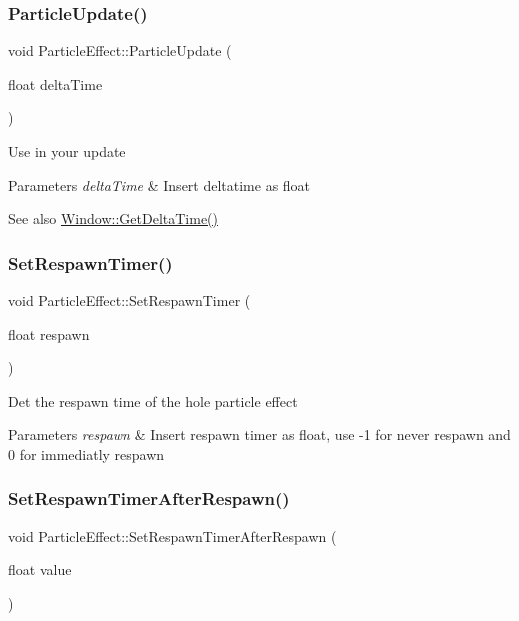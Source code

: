 \subsubsection{\texorpdfstring{ParticleUpdate()}{ParticleUpdate()}}
{\footnotesize\ttfamily void Particle\+Effect\+::\+Particle\+Update (\begin{DoxyParamCaption}\item[{float}]{delta\+Time }\end{DoxyParamCaption})}

Use in your update 
\begin{DoxyParams}{Parameters}
{\em delta\+Time} & Insert deltatime as float \\
\hline
\end{DoxyParams}
\begin{DoxySeeAlso}{See also}
\mbox{\hyperlink{class_window_ae7ce0586147cc93ba68d6ee929413f22}{Window\+::\+Get\+Delta\+Time()}} 
\end{DoxySeeAlso}
\mbox{\label{class_particle_effect_a62001aac47d157b8bbdc7d749f0f5c93}} 
\subsubsection{\texorpdfstring{SetRespawnTimer()}{SetRespawnTimer()}}
{\footnotesize\ttfamily void Particle\+Effect\+::\+Set\+Respawn\+Timer (\begin{DoxyParamCaption}\item[{float}]{respawn }\end{DoxyParamCaption})}

Det the respawn time of the hole particle effect 
\begin{DoxyParams}{Parameters}
{\em respawn} & Insert respawn timer as float, use -\/1 for never respawn and 0 for immediatly respawn \\
\hline
\end{DoxyParams}
\mbox{\label{class_particle_effect_a61209f0862c570e840664fb4e4051b01}} 
\subsubsection{\texorpdfstring{SetRespawnTimerAfterRespawn()}{SetRespawnTimerAfterRespawn()}}
{\footnotesize\ttfamily void Particle\+Effect\+::\+Set\+Respawn\+Timer\+After\+Respawn (\begin{DoxyParamCaption}\item[{float}]{value }\end{DoxyParamCaption})}

